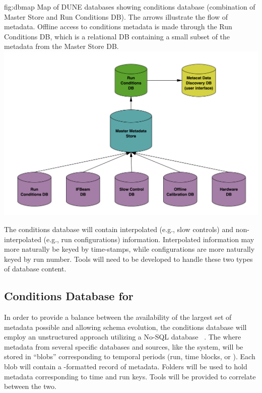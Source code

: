 \documentclass[../main-v1.tex]{subfiles}
\begin{document}
\begin{dunefigure}
{fig:dbmap} 
{Map of DUNE databases showing conditions database (combination of Master Store and Run Conditions DB). The arrows illustrate the flow of metadata. Offline access to conditions metadata is made through the Run Conditions DB, which is a relational DB containing a small subset of the metadata from the Master Store DB. }
\includegraphics[width=.9\columnwidth]{graphics/Databases/DBSystem-cartoon.png}
\end{dunefigure}

The conditions database will contain interpolated (e.g., slow controls) and non-interpolated (e.g., run configurations) information. Interpolated information may more naturally be keyed by time-stamps, while configurations are more naturally keyed by run number. Tools will need to be developed to handle these two types of database content. 

\subsection{Conditions Database for }

In order to provide a balance between the availability of the largest set of metadata possible  and allowing schema evolution,  the  conditions database will employ an unstructured approach utilizing a No-SQL database ~\cite{bib:ucondb}. The  where metadata from several specific databases and sources, like the  system, will be stored in ``blobs'' corresponding to temporal periods (run, time blocks, or ). Each blob will contain a -formatted record of metadata. Folders will be used to hold metadata corresponding to time and run keys. Tools will be provided to correlate between the two. 
\end{document}
